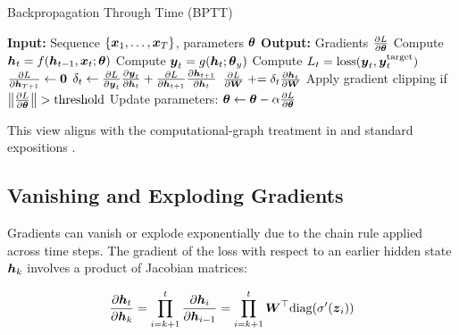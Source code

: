 \begin{algorithm}[h]
\caption{Backpropagation Through Time (BPTT)}
\label{alg:bptt}
\begin{algorithmic}[1]
\State \textbf{Input:} Sequence $\{\boldsymbol{x}_1, \ldots, \boldsymbol{x}_T\}$, parameters $\boldsymbol{\theta}$
\State \textbf{Output:} Gradients $\frac{\partial L}{\partial \boldsymbol{\theta}}$
\State
\State {}
    \State Compute $\boldsymbol{h}_t = f(\boldsymbol{h}_{t-1}, \boldsymbol{x}_t; \boldsymbol{\theta})$
    \State Compute $\boldsymbol{y}_t = g(\boldsymbol{h}_t; \boldsymbol{\theta}_y)$
    \State Compute $L_t = \text{loss}(\boldsymbol{y}_t, \boldsymbol{y}_t^{\text{target}})$
\EndFor
\State
\State {}
\State $\frac{\partial L}{\partial \boldsymbol{h}_{T+1}} \leftarrow \boldsymbol{0}$
\State
\State {}
    \State $\delta_t \leftarrow \frac{\partial L}{\partial \boldsymbol{y}_t} \frac{\partial \boldsymbol{y}_t}{\partial \boldsymbol{h}_t} + \frac{\partial L}{\partial \boldsymbol{h}_{t+1}} \frac{\partial \boldsymbol{h}_{t+1}}{\partial \boldsymbol{h}_t}$
    \State $\frac{\partial L}{\partial \boldsymbol{W}} \mathrel{+}= \delta_t \frac{\partial \boldsymbol{h}_t}{\partial \boldsymbol{W}}$ 
\EndFor
\State
\State {}
\State Apply gradient clipping if $\left\lVert\frac{\partial L}{\partial \boldsymbol{\theta}}\right\rVert > \text{threshold}$
\State Update parameters: $\boldsymbol{\theta} \leftarrow \boldsymbol{\theta} - \alpha \frac{\partial L}{\partial \boldsymbol{\theta}}$
\end{algorithmic}
\end{algorithm}

This view aligns with the computational-graph treatment in \cite{GoodfellowEtAl2016} and standard expositions \cite{WebDLBRNN,D2LChapterRNN}.

\subsection{Vanishing and Exploding Gradients}

Gradients can vanish or explode exponentially due to the chain rule applied across time steps. The gradient of the loss with respect to an earlier hidden state $\boldsymbol{h}_k$ involves a product of Jacobian matrices:

\begin{equation}
\frac{\partial \boldsymbol{h}_t}{\partial \boldsymbol{h}_k} = \prod_{i=k+1}^{t} \frac{\partial \boldsymbol{h}_i}{\partial \boldsymbol{h}_{i-1}} = \prod_{i=k+1}^{t} \boldsymbol{W}^\top \text{diag}(\sigma'(\boldsymbol{z}_i))
\end{equation}

